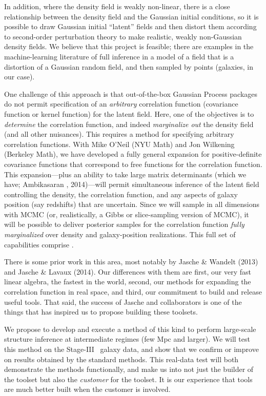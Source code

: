 \documentclass[12pt]{article}
\begin{document}
In addition, where the density field is weakly non-linear, there is a close
relationship between the density field and the Gaussian initial
conditions, so it is possible to draw Gaussian initial ``latent''
fields and then distort them according to second-order perturbation
theory to make realistic, weakly non-Gaussian density fields.
We believe that this project is feasible; there are examples in
the machine-learning literature of full inference in a model of a
field that is a distortion of a Gaussian random field, and then
sampled by points (galaxies, in our case).

One challenge of this approach is that out-of-the-box Gaussian Process
packages do not permit specification of an \emph{arbitrary}
correlation function (covariance function or kernel function) for the
latent field.
Here, one of the objectives is to \emph{determine} the correlation
function, and indeed \emph{marginalize out} the density field (and all
other nuisances).
This requires a method for specifying arbitrary correlation functions.
With Mike O'Neil (NYU Math) and Jon Wilkening (Berkeley Math), we have
developed a fully general expansion for positive-definite covariance
functions that correspond to free functions for the correlation
function.
This expansion---plus an ability to take large matrix determinants
(which we have; Ambikasaran \etal, 2014)---will permit simultaneous inference of the
latent field controlling the density, the correlation function, and
any aspects of galaxy position (say redshifts) that are uncertain.
Since we will sample in all dimensions with MCMC (or, realistically, a
Gibbs or slice-sampling version of MCMC), it will be possible to
deliver posterior samples for the correlation function \emph{fully
  marginalized} over density and galaxy-position realizations.
This full set of capabilities comprise .

There is some prior work in this area, most notably by Jasche \&
Wandelt (2013) and Jasche \& Lavaux (2014).
Our differences with them are first, our very fast linear algebra, the
fastest in the world, second, our methods for expanding the
correlation function in real space, and third, our commitment to build
and release useful tools.
That said, the success of Jasche and collaborators is one of the
things that has inspired us to propose building these toolsets.

We propose to develop and execute a method of this kind to perform
large-scale structure inference at intermediate regimes (few Mpc and
larger).
We will test this method on the Stage-III \boss\ galaxy data, and show
that we confirm or improve on results obtained by the standard
methods.
This real-data test will both demonstrate the methods functionally,
and make us into not just the builder of the toolset but also the
\emph{customer} for the toolset.
It is our experience that tools are much better built when the
customer is involved.
\end{document}
